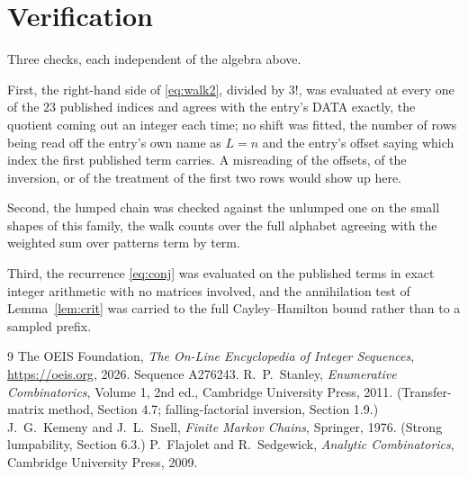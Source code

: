 \documentclass[11pt,a4paper]{article}
\theoremstyle{plain}
\theoremstyle{definition}
\begin{document}
\section{Verification}

Three checks, each independent of the algebra above.

First, the right-hand side of \eqref{eq:walk2}, divided by $3!$, was evaluated at every
one of the $23$ published indices and agrees with the entry's DATA exactly, the quotient
coming out an integer each time; no shift was fitted, the number of rows being read off the
entry's own name as $L=n$ and the entry's offset saying which index the first published
term carries. A misreading of the offsets, of the inversion, or of the treatment of the first
two rows would show up here.

Second, the lumped chain was checked against the unlumped one on the small shapes of this
family, the walk counts over the full alphabet agreeing with the weighted sum over patterns
term by term.

Third, the recurrence \eqref{eq:conj} was evaluated on the published terms in exact integer
arithmetic with no matrices involved, and the annihilation test of Lemma~\ref{lem:crit} was
carried to the full Cayley--Hamilton bound rather than to a sampled prefix.

\begin{thebibliography}{9}
 The OEIS Foundation, \emph{The On-Line Encyclopedia of Integer
Sequences}, \url{https://oeis.org}, 2026. Sequence A276243.
 R.~P.~Stanley, \emph{Enumerative Combinatorics}, Volume 1, 2nd ed.,
Cambridge University Press, 2011. (Transfer-matrix method, Section 4.7; falling-factorial
inversion, Section 1.9.)
 J.~G.~Kemeny and J.~L.~Snell, \emph{Finite Markov Chains}, Springer,
1976. (Strong lumpability, Section 6.3.)
 P.~Flajolet and R.~Sedgewick, \emph{Analytic Combinatorics}, Cambridge
University Press, 2009.
\end{thebibliography}
\end{document}
